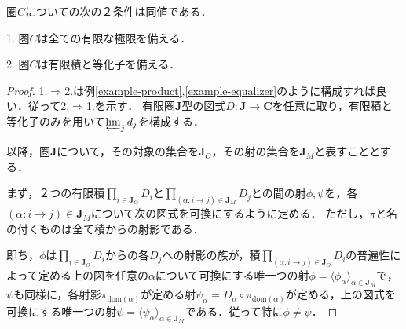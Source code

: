 \documentclass[uplatex, dvipdfmx]{jsarticle}
\begin{document}
\begin{proposition}\label{prop-necessaries-for-limits}
    圏$C$についての次の２条件は同値である．

    1. 圏$C$は全ての有限な極限を備える．

    2. 圏$C$は有限積と等化子を備える．
\end{proposition}
\begin{proof}
    1.$\Rightarrow$2.は例\ref{example-product},\ref{example-equalizer}のように構成すれば良い．従って2.$\Rightarrow$1.を示す．
    有限圏$\mathbf{J}$型の図式$D:\mathbf{J}\to\mathbf{C}$を任意に取り，有限積と等化子のみを用いて$\varprojlim_{j}d_j$を構成する．

    以降，圏$\mathbf{J}$について，その対象の集合を$\mathbf{J}_O$，その射の集合を$\mathbf{J}_M$と表すこととする．
    
    まず，２つの有限積$\prod_{i\in\mathbf{J}_O}D_i$と$\prod_{(\alpha:i\to j)\in\mathbf{J}_M}D_j$との間の射$\phi,\psi$を，各$(\alpha:i\to j)\in\mathbf{J}_M$について次の図式を可換にするように定める．
    ただし，$\pi$と名の付くものは全て積からの射影である．
    \begin{center}
    \end{center}
    即ち，$\phi$は$\prod_{i\in\mathbf{J}_O}D_i$からの各$D_j$への射影の族が，積$\prod_{(\alpha:i\to j)\in\mathbf{J}_O}D_i$の普遍性によって定める上の図を任意の$\alpha$について可換にする唯一つの射$\phi=\langle\phi_\alpha\rangle_{\alpha\in\mathbf{J}_M}$で，$\psi$も同様に，各射影$\pi_{\mathrm{dom}(\alpha)}$が定める射$\psi_\alpha=D_\alpha\circ\pi_{\mathrm{dom}(\alpha)}$が定める，上の図式を可換にする唯一つの射$\psi=\langle\psi_\alpha\rangle_{\alpha\in\mathbf{J}_M}$である．従って特に$\phi\ne\psi$．


\end{proof}
\end{document}
